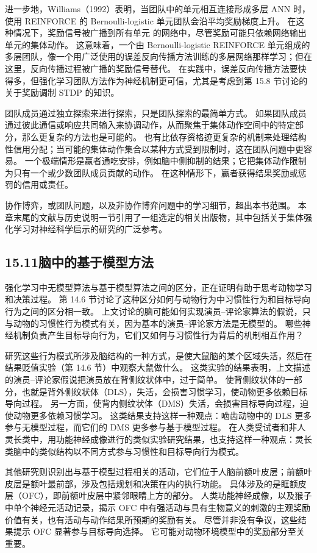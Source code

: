 \documentclass[UTF8, 12pt, fontset=fandol, oneside]{ctexart}
\begin{document}
进一步地，Williams（1992）表明，当团队中的单元相互连接形成多层 ANN 时，使用 REINFORCE 的 Bernoulli-logistic 单元团队会沿平均奖励梯度上升。
在这种情况下，奖励信号被广播到所有单元
的网络中，尽管奖励可能只依赖网络输出单元的集体动作。
这意味着，一个由 Bernoulli-logistic REINFORCE 单元组成的多层团队，像一个用广泛使用的误差反向传播方法训练的多层网络那样学习；但在这里，反向传播过程被广播的奖励信号替代。
在实践中，误差反向传播方法要快得多，但强化学习团队方法作为神经机制更可信，尤其是考虑到第 15.8 节讨论的关于奖励调制 STDP 的知识。

团队成员通过独立探索来进行探索，只是团队探索的最简单方式。
如果团队成员通过彼此通信或响应共同输入来协调动作，从而聚焦于集体动作空间中的特定部分，那么更复杂的方法也是可能的。
也有比依存资格迹更复杂的机制来处理结构性信用分配；当可能的集体动作集合以某种方式受到限制时，这在团队问题中更容易。
一个极端情形是赢者通吃安排，例如脑中侧抑制的结果；它把集体动作限制为只有一个或少数团队成员贡献的动作。
在这种情形下，赢者获得结果奖励或惩罚的信用或责任。

协作博弈，或团队问题，以及非协作博弈问题中的学习细节，超出本书范围。
本章末尾的文献与历史说明一节引用了一组选定的相关出版物，其中包括关于集体强化学习对神经科学启示的研究的广泛参考。

\subsection*{15.11\quad 脑中的基于模型方法}

强化学习中无模型算法与基于模型算法之间的区分，正在证明有助于思考动物学习和决策过程。
第 14.6 节讨论了这种区分如何与动物行为中习惯性行为和目标导向行为之间的区分相一致。
上文讨论的脑可能如何实现演员--评论家算法的假说，只与动物的习惯性行为模式有关，因为基本的演员--评论家方法是无模型的。
哪些神经机制负责产生目标导向行为，它们又如何与习惯性行为背后的机制相互作用？

研究这些行为模式所涉及脑结构的一种方式，是使大鼠脑的某个区域失活，然后在结果贬值实验（第 14.6 节）中观察大鼠做什么。
这类实验的结果表明，上文描述的演员--评论家假说把演员放在背侧纹状体中，过于简单。
使背侧纹状体的一部分，也就是背外侧纹状体（DLS），失活，会损害习惯学习，使动物更多依赖目标导向过程。
另一方面，使背内侧纹状体（DMS）失活，会损害目标导向过程，迫使动物更多依赖习惯学习。
这类结果支持这样一种观点：啮齿动物中的 DLS 更多参与无模型过程，而它们的 DMS 更多参与基于模型过程。
在人类受试者和非人灵长类中，用功能神经成像进行的类似实验研究结果，也支持这样一种观点：灵长类脑中的类似结构以不同方式参与习惯性和目标导向行为模式。

其他研究则识别出与基于模型过程相关的活动，它们位于人脑前额叶皮层；前额叶皮层是额叶最前部，涉及包括规划和决策在内的执行功能。
具体涉及的是眶额皮层（OFC），即前额叶皮层中紧邻眼睛上方的部分。
人类功能神经成像，以及猴子中单个神经元活动记录，揭示 OFC 中有强活动与具有生物意义的刺激的主观奖励价值有关，也有活动与动作结果所预期的奖励有关。
尽管并非没有争议，这些结果提示 OFC 显著参与目标导向选择。
它可能对动物环境模型中的奖励部分至关重要。
\end{document}
